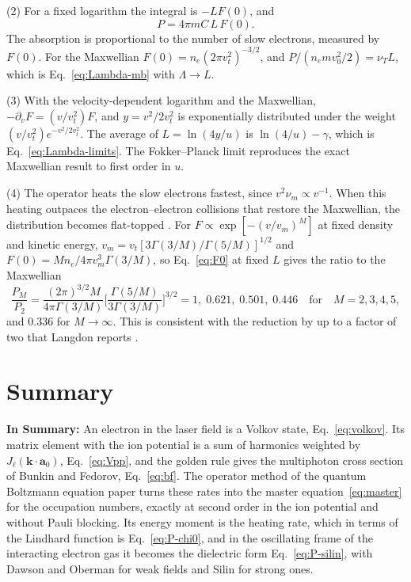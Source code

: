 \documentclass[11pt]{article}
\numberwithin{equation}{section}
\newcommand{\av}{\mathbf a_0}
\newcommand{\kv}{\mathbf k}
\newcommand{\nuT}{\nu_T}
\begin{document}
{\noindent}(2) For a fixed logarithm the integral is $-LF(0)$, and
\begin{equation}
\boxed{\;P=4\pi mC\,L\,F(0).\;}
\label{eq:F0}
\end{equation}
The absorption is proportional to the number of slow electrons, measured by
$F(0)$. For the Maxwellian $F(0)=n_e(2\pi v_t^2)^{-3/2}$, and
$P/(n_emv_0^2/2)=\nuT L$, which is Eq.~\eqref{eq:Lambda-mb} with
$\Lambda\to L$.

{\noindent}(3) With the velocity-dependent logarithm and the Maxwellian,
$-\partial_vF=(v/v_t^2)F$, and $y=v^2/2v_t^2$ is exponentially distributed
under the weight $(v/v_t^2)e^{-v^2/2v_t^2}$. The average of
$L=\ln(4y/u)$ is $\ln(4/u)-\gamma$, which is Eq.~\eqref{eq:Lambda-limits}. The
Fokker--Planck limit reproduces the exact Maxwellian result to first order in
$u$.

{\noindent}(4) The operator heats the slow electrons fastest, since
$v^2\nu_m\propto v^{-1}$. When this heating outpaces the electron--electron
collisions that restore the Maxwellian, the distribution becomes flat-topped
\cite{Langdon1980}. For $F\propto\exp[-(v/v_m)^M]$ at fixed density and kinetic
energy, $v_m=v_t[3\Gamma(3/M)/\Gamma(5/M)]^{1/2}$ and
$F(0)=Mn_e/4\pi v_m^3\Gamma(3/M)$, so Eq.~\eqref{eq:F0} at fixed $L$ gives the
ratio to the Maxwellian
\begin{equation}
\boxed{\;\frac{P_M}{P_2}=\frac{(2\pi)^{3/2}M}{4\pi\Gamma(3/M)}\Big[\frac{\Gamma(5/M)}{3\Gamma(3/M)}\Big]^{3/2}
=1,\;0.621,\;0.501,\;0.446\quad\text{for}\quad M=2,3,4,5,\;}
\label{eq:superG}
\end{equation}
and $0.336$ for $M\to\infty$. This is consistent with the reduction by up to a
factor of two that Langdon reports \cite{Langdon1980}.


\section{Summary}
\label{sec:summary}
\noindent\textbf{In Summary:} An electron in the laser field is a Volkov
state, Eq.~\eqref{eq:volkov}. Its matrix element with the ion potential is a
sum of harmonics weighted by $J_\ell(\kv\cdot\av)$, Eq.~\eqref{eq:Vpp}, and
the golden rule gives the multiphoton cross section of Bunkin and Fedorov,
Eq.~\eqref{eq:bf}. The operator method of the quantum Boltzmann equation paper
turns these rates into the master equation~\eqref{eq:master} for the
occupation numbers, exactly at second order in the ion potential and without
Pauli blocking. Its energy moment is the heating rate, which in terms of the
Lindhard function is Eq.~\eqref{eq:P-chi0}, and in the oscillating frame of
the interacting electron gas it becomes the dielectric form
Eq.~\eqref{eq:P-silin}, with Dawson and Oberman for weak fields and Silin for
strong ones.
\end{document}
